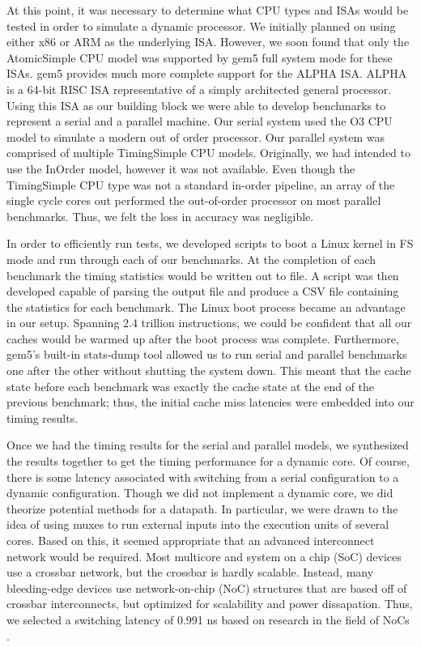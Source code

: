 At this point, it was necessary to determine what CPU types and ISAs would be tested in order to simulate a dynamic processor. We initially planned on using either x86 or ARM as the underlying ISA. However, we soon found that only the AtomicSimple CPU model was supported by gem5 full system mode for these ISAs. gem5 provides much more complete support for the ALPHA ISA. ALPHA is a 64-bit RISC ISA representative of a simply architected general processor. Using this ISA as our building block we were able to develop benchmarks to represent a serial and a parallel machine. Our serial system used the O3 CPU model to simulate a modern out of order processor. Our parallel system was comprised of multiple TimingSimple CPU models. Originally, we had intended to use the InOrder model, however it was not available. Even though the TimingSimple CPU type was not a standard in-order pipeline, an array of the single cycle cores out performed the out-of-order processor on most parallel benchmarks. Thus, we felt the loss in accuracy was negligible.

In order to efficiently run tests, we developed scripts to boot a Linux kernel in FS mode and run through each of our benchmarks. At the completion of each benchmark the timing statistics would be written out to file. A script was then developed capable of parsing the output file and produce a CSV file containing the statistics for each benchmark. The Linux boot process became an advantage in our setup. Spanning 2.4 trillion instructions, we could be confident that all our caches would be warmed up after the boot process was complete. Furthermore, gem5's built-in stats-dump tool allowed us to run serial and parallel benchmarks one after the other without shutting the system down. This meant that the cache state before each benchmark was exactly the cache state at the end of the previous benchmark; thus, the initial cache miss latencies were embedded into our timing results.

Once we had the timing results for the serial and parallel models, we synthesized the results together to get the timing performance for a dynamic core. Of course, there is some latency associated with switching from a serial configuration to a dynamic configuration. Though we did not implement a dynamic core, we did theorize potential methods for a datapath. In particular, we were drawn to the idea of using muxes to run external inputs into the execution units of several cores. Based on this, it seemed appropriate that an advanced interconnect network would be required. Most multicore and system on a chip (SoC) devices use a crossbar network, but the crossbar is hardly scalable. Instead, many bleeding-edge devices use network-on-chip (NoC) structures that are based off of crossbar interconnects, but optimized for scalability and power dissapation. Thus, we selected a switching latency of 0.991 ns based on research in the field of NoCs \cite{lee}.

